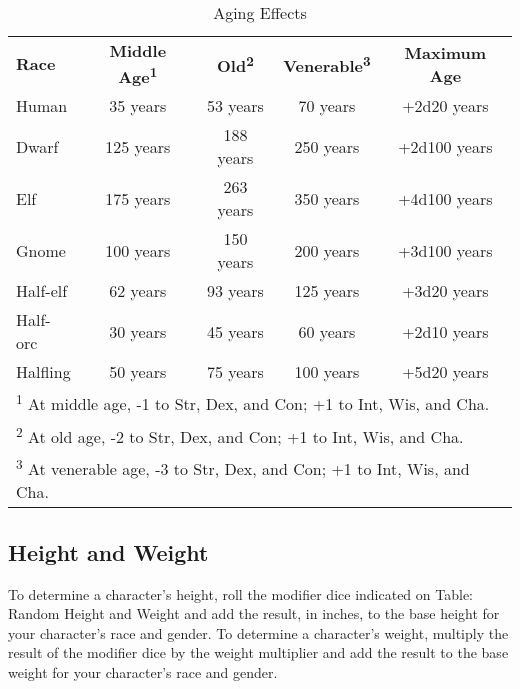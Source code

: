 \begin{table}[htb]
\sffamily
{}
\caption{Aging Effects}
\centering
\begin{tabular}{l c c c c}
\textbf{Race} & \textbf{Middle Age\textsuperscript{1}} & \textbf{Old\textsuperscript{2}} & \textbf{Venerable\textsuperscript{3}} & \textbf{Maximum Age}\\
Human & 35 years & 53 years & 70 years & +2d20 years\\
Dwarf & 125 years & 188 years & 250 years & +2d100 years\\
Elf & 175 years & 263 years & 350 years & +4d100 years\\
Gnome & 100 years & 150 years & 200 years & +3d100 years\\
Half-elf & 62 years & 93 years & 125 years & +3d20 years\\
Half-orc & 30 years & 45 years & 60 years & +2d10 years\\
Halfling & 50 years & 75 years & 100 years & +5d20 years\\
\multicolumn{5}{l}{\textsuperscript{1} At middle age, -1 to Str, Dex, and Con; +1 to Int, Wis, and Cha.}\\
\multicolumn{5}{l}{\textsuperscript{2} At old age, -2 to Str, Dex, and Con; +1 to Int, Wis, and Cha.}\\
\multicolumn{5}{l}{\textsuperscript{3} At venerable age, -3 to Str, Dex, and Con; +1 to Int, Wis, and Cha.}\\
\end{tabular}
\end{table}


				
\subsection{Height and Weight}

				
To determine a character's height, roll the modifier dice indicated on Table: Random Height and Weight and add the result, in inches, to the base height for your character's race and gender. To determine a character's weight, multiply the result of the modifier dice by the weight multiplier and add the result to the base weight for your character's race and gender.
				
